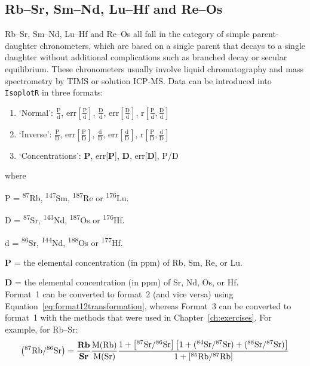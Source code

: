 \begin{refsection}

\chapter{Rb--Sr, Sm--Nd, Lu--Hf and Re--Os}\label{ch:PD}

Rb--Sr, Sm--Nd, Lu--Hf and Re--Os all fall in the category of simple
parent-daughter chronometers, which are based on a single parent that
decays to a single daughter without additional complications such as
branched decay or secular equilibrium. These chronometers usually
involve liquid chromatography and mass spectrometry by TIMS or
solution ICP-MS. Data can be introduced into \texttt{IsoplotR} in
three formats:

\begin{enumerate}
\item{`Normal':}
  $\frac{\mbox{P}}{\mbox{d}}$,  
  $\mbox{err}\!\left[\frac{\mbox{P}}{\mbox{d}}\right]$, 
  $\frac{\mbox{D}}{\mbox{d}}$,  
  $\mbox{err}\!\left[\frac{\mbox{D}}{\mbox{d}}\right]$,  
  $\mbox{r}\!\left[\frac{\mbox{P}}{\mbox{d}},
  \frac{\mbox{D}}{\mbox{d}}\right]$
\item{`Inverse':}
  $\frac{\mbox{P}}{\mbox{D}}$,  
  $\mbox{err}\!\left[\frac{\mbox{P}}{\mbox{D}}\right]$, 
  $\frac{\mbox{d}}{\mbox{D}}$,  
  $\mbox{err}\!\left[\frac{\mbox{d}}{\mbox{D}}\right]$,  
  $\mbox{r}\!\left[\frac{\mbox{P}}{\mbox{D}},
  \frac{\mbox{d}}{\mbox{D}}\right]$
\item{`Concentrations':}
  \textbf{P}, err[\textbf{P}], \textbf{D}, err[\textbf{D}], P/D
\end{enumerate}

\noindent where

\noindent P = \textsuperscript{87}Rb, \textsuperscript{147}Sm,
\textsuperscript{187}Re or \textsuperscript{176}Lu.

\noindent D = \textsuperscript{87}Sr, \textsuperscript{143}Nd,
\textsuperscript{187}Os or \textsuperscript{176}Hf.

\noindent d = \textsuperscript{86}Sr, \textsuperscript{144}Nd,
\textsuperscript{188}Os or \textsuperscript{177}Hf.

\noindent \textbf{P} = the elemental concentration (in ppm) of Rb, Sm,
Re, or Lu.

\noindent \textbf{D} = the elemental concentration (in ppm) of Sr, Nd,
Os, or Hf.\\

Format~1 can be converted to format~2 (and vice versa) using
Equation~\ref{eq:format12transformation}, whereas Format~3 can be
converted to format~1 with the methods that were used in
Chapter~\ref{ch:exercises}. For example, for Rb--Sr:
\begin{equation}
  \left({}^{87}\mbox{Rb}/{}^{86}\mbox{Sr}\right) = 
  \frac{\mbox{\textbf{Rb}}}{\mbox{\textbf{Sr}}}
  \frac{\mbox{M(Rb)}}{\mbox{M(Sr)}}
  \frac{
    1+\left[{{}^{87}\mbox{Sr}}/{{}^{86}\mbox{Sr}}\right]
    \left[1+({}^{84}\mbox{Sr}/{}^{87}\mbox{Sr}) +
      ({}^{88}\mbox{Sr}/{}^{87}\mbox{Sr}) \right]
  }{
    1+[{}^{85}\mbox{Rb}/{}^{87}\mbox{Rb}]
  }
  \label{eq:ppm2ratios}
\end{equation}


\end{refsection}

